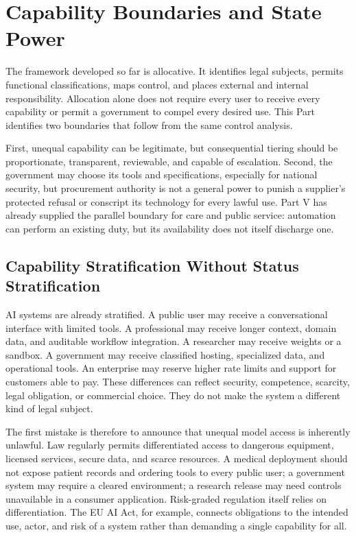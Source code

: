 \section{Capability Boundaries and State Power}
\label{sec:boundaries}

The framework developed so far is allocative. It identifies legal subjects, permits functional classifications, maps control, and places external and internal responsibility. Allocation alone does not require every user to receive every capability or permit a government to compel every desired use. This Part identifies two boundaries that follow from the same control analysis.

First, unequal capability can be legitimate, but consequential tiering should be proportionate, transparent, reviewable, and capable of escalation. Second, the government may choose its tools and specifications, especially for national security, but procurement authority is not a general power to punish a supplier's protected refusal or conscript its technology for every lawful use. Part V has already supplied the parallel boundary for care and public service: automation can perform an existing duty, but its availability does not itself discharge one.

\subsection{Capability Stratification Without Status Stratification}

AI systems are already stratified. A public user may receive a conversational interface with limited tools. A professional may receive longer context, domain data, and auditable workflow integration. A researcher may receive weights or a sandbox. A government may receive classified hosting, specialized data, and operational tools. An enterprise may reserve higher rate limits and support for customers able to pay. These differences can reflect security, competence, scarcity, legal obligation, or commercial choice. They do not make the system a different kind of legal subject.

The first mistake is therefore to announce that unequal model access is inherently unlawful. Law regularly permits differentiated access to dangerous equipment, licensed services, secure data, and scarce resources. A medical deployment should not expose patient records and ordering tools to every public user; a government system may require a cleared environment; a research release may need controls unavailable in a consumer application. Risk-graded regulation itself relies on differentiation. The EU AI Act, for example, connects obligations to the intended use, actor, and risk of a system rather than demanding a single capability for all.

